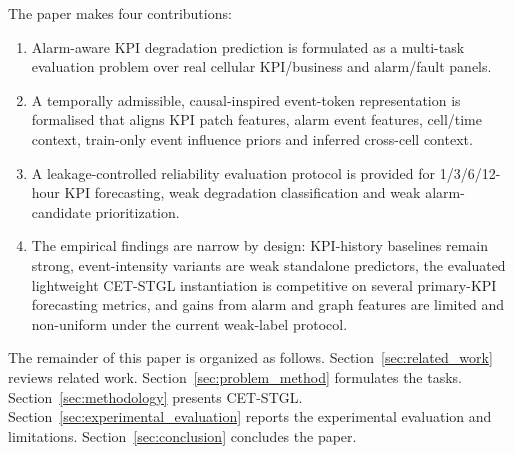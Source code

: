 The paper makes four contributions:
\begin{enumerate}
    \item Alarm-aware KPI degradation prediction is formulated as a multi-task evaluation problem over real cellular KPI/business and alarm/fault panels.
    \item A temporally admissible, causal-inspired event-token representation is formalised that aligns KPI patch features, alarm event features, cell/time context, train-only event influence priors and inferred cross-cell context.
    \item A leakage-controlled reliability evaluation protocol is provided for 1/3/6/12-hour KPI forecasting, weak degradation classification and weak alarm-candidate prioritization.
    \item The empirical findings are narrow by design: KPI-history baselines remain strong, event-intensity variants are weak standalone predictors, the evaluated lightweight CET-STGL instantiation is competitive on several primary-KPI forecasting metrics, and gains from alarm and graph features are limited and non-uniform under the current weak-label protocol.
\end{enumerate}

The remainder of this paper is organized as follows. Section~\ref{sec:related_work} reviews related work. Section~\ref{sec:problem_method} formulates the tasks. Section~\ref{sec:methodology} presents CET-STGL. Section~\ref{sec:experimental_evaluation} reports the experimental evaluation and limitations. Section~\ref{sec:conclusion} concludes the paper.
